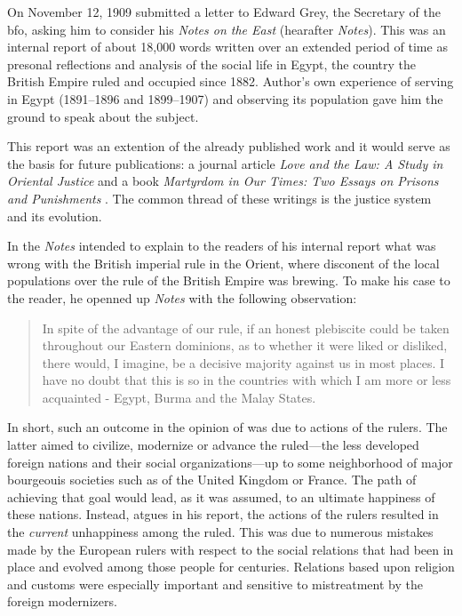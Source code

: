 On November 12, 1909 \citeauthor{innes1909} submitted a letter to Edward Grey, the Secretary of the \ac{bfo}, asking him to consider his \textit{Notes on the East} (hearafter \textit{Notes}). This was an internal report of about 18,000 words written over an extended period of time as presonal reflections and analysis of the social life in Egypt, the country the British Empire ruled and occupied since 1882. Author's own experience of serving in Egypt (1891--1896 and 1899--1907) and observing its population gave him the ground to speak about the subject.  

This report was an extention of the already published work \citep{innes1907} and it would serve as the basis for future publications: a journal article \textit{Love and the Law: A Study in Oriental Justice} \citep{innes1913_} and a book \textit{Martyrdom in Our Times: Two Essays on Prisons and Punishments} \citep{innes1932}. The common thread of these writings is the justice system and its evolution.

In the \textit{Notes} \citeauthor{innes1909} intended to explain to the readers of his internal report what was wrong with the British imperial rule in the Orient, where disconent of the local populations over the rule of the British Empire was brewing. To make his case to the reader, he openned up \textit{Notes} with the following observation:

\begin{quote}
In spite of the advantage of our rule, if an honest plebiscite could be taken throughout our Eastern dominions, as to whether it were liked or disliked, there would, I imagine, be a decisive majority against us in most places. I have no doubt that this is so in the countries with which I am more or less acquainted - Egypt, Burma and the Malay States. \citep[p.~1]{innes1909}
\end{quote}

In short, such an outcome in the opinion of \citeauthor{innes1909} was due to actions of the rulers. The latter aimed to civilize, modernize or advance the ruled---the less developed foreign nations and their social organizations---up to some neighborhood of major bourgeouis societies such as of the United Kingdom or France. The path of achieving that goal would lead, as it was assumed, to an ultimate happiness of these nations. Instead, \citeauthor{innes1909} atgues in his report, the actions of the rulers resulted in the \textit{current} unhappiness among the ruled. This was due to numerous mistakes made by the European rulers with respect to the social relations that had been in place and evolved among those people for centuries. Relations based upon religion and customs were especially important and sensitive to mistreatment by the foreign modernizers.

